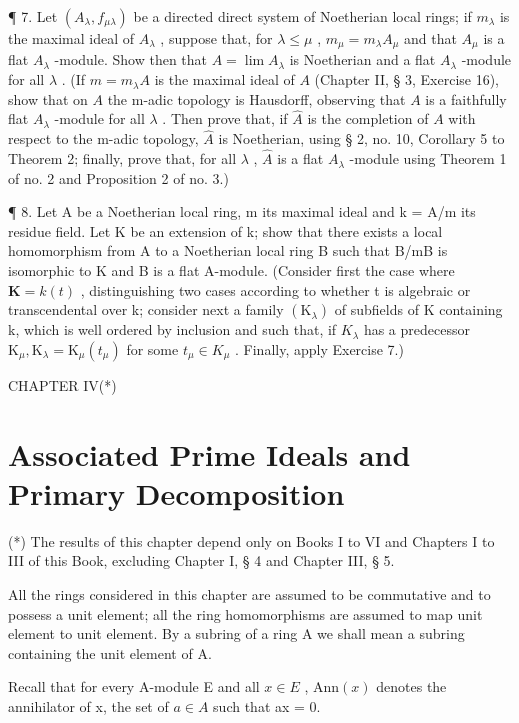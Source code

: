 ¶ 7. Let \((A_{\lambda}, f_{\mu\lambda})\) be a directed direct system of Noetherian local rings; if \(m_{\lambda}\) is the maximal ideal of \(A_{\lambda}\) , suppose that, for \(\lambda \leqslant \mu\) , \(m_{\mu} = m_{\lambda}A_{\mu}\) and that \(A_{\mu}\) is a flat \(A_{\lambda}\) -module. Show then that \(A = \lim A_{\lambda}\) is Noetherian and a flat \(A_{\lambda}\) -module for all \(\lambda\) . (If \(m = m_{\lambda}A\) is the maximal ideal of \(A\) (Chapter II, § 3, Exercise 16), show that on \(A\) the m-adic topology is Hausdorff, observing that \(A\) is a faithfully flat \(A_{\lambda}\) -module for all \(\lambda\) . Then prove that, if \(\hat{A}\) is the completion of \(A\) with respect to the m-adic topology, \(\hat{A}\) is Noetherian, using § 2, no. 10, Corollary 5 to Theorem 2; finally, prove that, for all \(\lambda\) , \(\hat{A}\) is a flat \(A_{\lambda}\) -module using Theorem 1 of no. 2 and Proposition 2 of no. 3.)

¶ 8. Let A be a Noetherian local ring, m its maximal ideal and k = A/m its residue field. Let K be an extension of k; show that there exists a local homomorphism from A to a Noetherian local ring B such that B/mB is isomorphic to K and B is a flat A-module. (Consider first the case where \(\mathbf{K} = k(t)\) , distinguishing two cases according to whether t is algebraic or transcendental over k; consider next a family \((\mathrm{K}_{\lambda})\) of subfields of K containing k, which is well ordered by inclusion and such that, if \(K_{\lambda}\) has a predecessor \(\mathrm{K}_{\mu}, \mathrm{K}_{\lambda} = \mathrm{K}_{\mu}(t_{\mu})\) for some \(t_{\mu} \in K_{\mu}\) . Finally, apply Exercise 7.)

CHAPTER IV(*)

\chapter{Associated Prime Ideals and Primary Decomposition}

(*) The results of this chapter depend only on Books I to VI and Chapters I to III of this Book, excluding Chapter I, § 4 and Chapter III, § 5.

All the rings considered in this chapter are assumed to be commutative and to possess a unit element; all the ring homomorphisms are assumed to map unit element to unit element. By a subring of a ring A we shall mean a subring containing the unit element of A.

Recall that for every A-module E and all \(x \in E\) , \(\text{Ann}(x)\) denotes the annihilator of x, the set of \(a \in A\) such that ax = 0.

